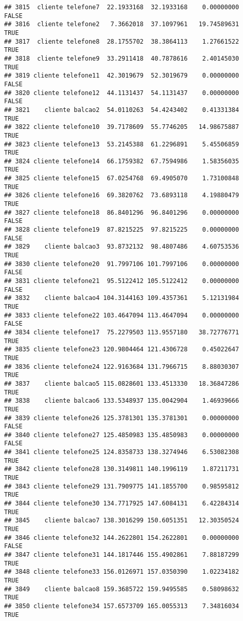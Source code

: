 \documentclass[
]{article}
\begin{document}
\begin{verbatim}
## 3815  cliente telefone7  22.1933168  32.1933168    0.00000000    FALSE
## 3816  cliente telefone2   7.3662018  37.1097961   19.74589631     TRUE
## 3817  cliente telefone8  28.1755702  38.3864113    1.27661522     TRUE
## 3818  cliente telefone9  33.2911418  40.7878616    2.40145030     TRUE
## 3819 cliente telefone11  42.3019679  52.3019679    0.00000000    FALSE
## 3820 cliente telefone12  44.1131437  54.1131437    0.00000000    FALSE
## 3821    cliente balcao2  54.0110263  54.4243402    0.41331384     TRUE
## 3822 cliente telefone10  39.7178609  55.7746205   14.98675887     TRUE
## 3823 cliente telefone13  53.2145388  61.2296891    5.45506859     TRUE
## 3824 cliente telefone14  66.1759382  67.7594986    1.58356035     TRUE
## 3825 cliente telefone15  67.0254768  69.4905070    1.73100848     TRUE
## 3826 cliente telefone16  69.3820762  73.6893118    4.19880479     TRUE
## 3827 cliente telefone18  86.8401296  96.8401296    0.00000000    FALSE
## 3828 cliente telefone19  87.8215225  97.8215225    0.00000000    FALSE
## 3829    cliente balcao3  93.8732132  98.4807486    4.60753536     TRUE
## 3830 cliente telefone20  91.7997106 101.7997106    0.00000000    FALSE
## 3831 cliente telefone21  95.5122412 105.5122412    0.00000000    FALSE
## 3832    cliente balcao4 104.3144163 109.4357361    5.12131984     TRUE
## 3833 cliente telefone22 103.4647094 113.4647094    0.00000000    FALSE
## 3834 cliente telefone17  75.2279503 113.9557180   38.72776771     TRUE
## 3835 cliente telefone23 120.9804464 121.4306728    0.45022647     TRUE
## 3836 cliente telefone24 122.9163684 131.7966715    8.88030307     TRUE
## 3837    cliente balcao5 115.0828601 133.4513330   18.36847286     TRUE
## 3838    cliente balcao6 133.5348937 135.0042904    1.46939666     TRUE
## 3839 cliente telefone26 125.3781301 135.3781301    0.00000000    FALSE
## 3840 cliente telefone27 125.4850983 135.4850983    0.00000000    FALSE
## 3841 cliente telefone25 124.8358733 138.3274946    6.53082308     TRUE
## 3842 cliente telefone28 130.3149811 140.1996119    1.87211731     TRUE
## 3843 cliente telefone29 131.7909775 141.1855700    0.98595812     TRUE
## 3844 cliente telefone30 134.7717925 147.6084131    6.42284314     TRUE
## 3845    cliente balcao7 138.3016299 150.6051351   12.30350524     TRUE
## 3846 cliente telefone32 144.2622801 154.2622801    0.00000000    FALSE
## 3847 cliente telefone31 144.1817446 155.4902861    7.88187299     TRUE
## 3848 cliente telefone33 156.0126971 157.0350390    1.02234182     TRUE
## 3849    cliente balcao8 159.3685722 159.9495585    0.58098632     TRUE
## 3850 cliente telefone34 157.6573709 165.0055313    7.34816034     TRUE

\end{verbatim}
\end{document}
